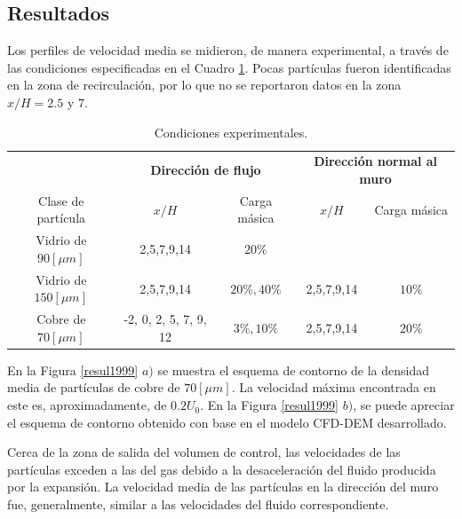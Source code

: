 \subsection{Resultados}

\noindent
\justify

Los perfiles de velocidad media se midieron, de manera experimental, a trav\'es de las condiciones especificadas en el Cuadro \ref{perfiles}. Pocas part\'iculas fueron identificadas en la zona de recirculaci\'on, por lo que no se reportaron datos en la zona $x/H = 2.5$ y $7$.

\begin{table}[h!]
	\centering
	\begin{adjustbox}{max width = \textwidth}
	\begin{tabular}{c c c c c}
		 & \multicolumn{2}{c}{\textbf{Direcci\'on de flujo}} & \multicolumn{2}{c}{\textbf{Direcci\'on normal al muro}} \\ \cmidrule{2-3}\cmidrule{4-5}
		 Clase de part\'icula & $x/H$ & Carga m\'asica & $x/H$ & Carga m\'asica \\ \hline
		 Vidrio de $90 [\mu m]$ & 2,5,7,9,14 & $20\%$ &  &  \\
		 Vidrio de $150 [\mu m]$ & 2,5,7,9,14 & $20\%, 40\%$ & 2,5,7,9,14 & $10\%$ \\
		 Cobre de $70 [\mu m]$ & -2, 0, 2, 5, 7, 9, 12 & $3\%, 10\%$ & 2,5,7,9,14 & $20\%$ \\
	\end{tabular}
	\end{adjustbox}
	\caption{Condiciones experimentales.}
	\label{perfiles}
\end{table}

\noindent
\justify

En la Figura \ref{resul1999} $a)$ se muestra el esquema de contorno de la densidad media de part\'iculas de cobre de $70 [\mu m]$. La velocidad m\'axima encontrada en este es, aproximadamente, de $0.2 U_0$. En la Figura \ref{resul1999} $b)$, se puede apreciar el esquema de contorno obtenido con base en el modelo CFD-DEM desarrollado.

\noindent
\justify

Cerca de la zona de salida del volumen de control, las velocidades de las part\'iculas exceden a las del gas debido a la desaceleraci\'on del fluido producida por la expansi\'on. La velocidad media de las part\'iculas en la direcci\'on del muro fue, generalmente, similar a las velocidades del fluido correspondiente.


\newpage

